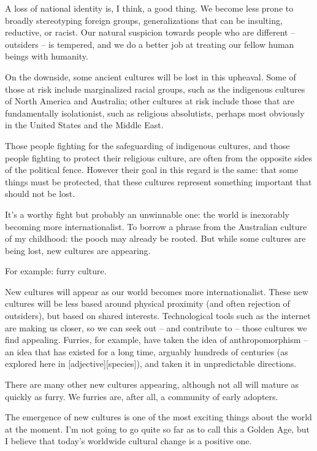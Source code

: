 A loss of national identity is, I think, a good thing. We become less prone to broadly stereotyping foreign groups, generalizations that can be insulting, reductive, or racist. Our natural suspicion towards people who are different -- outsiders -- is tempered, and we do a better job at treating our fellow human beings with humanity.

On the downside, some ancient cultures will be lost in this upheaval. Some of those at risk include marginalized racial groups, such as the indigenous cultures of North America and Australia; other cultures at risk include those that are fundamentally isolationist, such as religious absolutists, perhaps most obviously in the United States and the Middle East.

Those people fighting for the safeguarding of indigenous cultures, and those people fighting to protect their religious culture, are often from the opposite sides of the political fence. However their goal in this regard is the same: that some things must be protected, that these cultures represent something important that should not be lost.

It's a worthy fight but probably an unwinnable one: the world is inexorably becoming more internationalist. To borrow a phrase from the Australian culture of my childhood: the pooch may already be rooted. But while some cultures are being lost, new cultures are appearing.

For example: furry culture.

New cultures will appear as our world becomes more internationalist. These new cultures will be less based around physical proximity (and often rejection of outsiders), but based on shared interests. Technological tools such as the internet are making us closer, so we can seek out -- and contribute to -- those cultures we find appealing. Furries, for example, have taken the idea of anthropomorphism -- an idea that has existed for a long time, arguably hundreds of centuries (as explored here in [adjective][species]), and taken it in unpredictable directions.

There are many other new cultures appearing, although not all will mature as quickly as furry. We furries are, after all, a community of early adopters.

The emergence of new cultures is one of the most exciting things about the world at the moment. I'm not going to go quite so far as to call this a Golden Age, but I believe that today's worldwide cultural change is a positive one.

